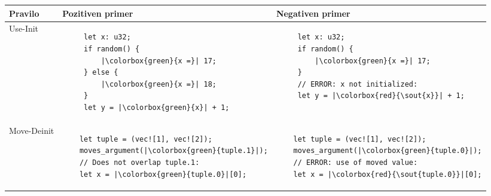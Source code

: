 \documentclass[a4paper,12pt,openright]{book}
\newcommand{\goodexample}[1]{\colorbox{green}{#1}}
\newcommand{\badexample}[1]{\colorbox{red}{\sout{#1}}}
\begin{document}
{ \renewcommand{\arraystretch}{2.0}
\begin{table}[!htbp]
	\begin{tabular}{p{} p{} p{}}
		Pravilo                                                     & Pozitiven primer & Negativen primer \\ \toprule
		Use-Init                                                    &                                     %
		\begin{minipage}[t]{0.41\textwidth}
			\begin{verbatim}
     let x: u32;
     if random() {
         |\goodexample{x =}| 17;
     } else {
         |\goodexample{x =}| 18;
     }
     let y = |\goodexample{x}| + 1;
    \end{verbatim}
		\end{minipage}           &                                                  %
		\begin{minipage}[t]{0.41\textwidth}
			\begin{verbatim}
     let x: u32;
     if random() {
         |\goodexample{x =}| 17;
     }
     // ERROR: x not initialized:
     let y = |\badexample{x}| + 1;
    \end{verbatim}
		\end{minipage}                                                  \\
		Move-Deinit                                                 &                                     %
		\begin{minipage}[t]{0.41\textwidth}
			\begin{verbatim}
    let tuple = (vec![1], vec![2]);
    moves_argument(|\goodexample{tuple.1}|);
    // Does not overlap tuple.1:
    let x = |\goodexample{tuple.0}|[0];
\end{verbatim}
		\end{minipage}            &                                                   %
		\begin{minipage}[t]{0.41\textwidth}
			\begin{verbatim}
    let tuple = (vec![1], vec![2]);
    moves_argument(|\goodexample{tuple.0}|);
    // ERROR: use of moved value:
    let x = |\badexample{tuple.0}|[0];
\end{verbatim}
		\end{minipage}                                                  \\

\end{tabular}
\end{table}}
\end{document}
